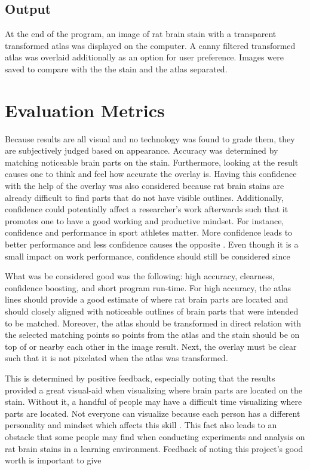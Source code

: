 \documentclass[10pt,twocolumn]{article}
\begin{document}
\subsection{Output}
At the end of the program, an image of rat brain stain with a transparent transformed atlas was displayed on the computer. A canny filtered transformed atlas was overlaid additionally as an option for user preference. Images were saved to compare with the the stain and the atlas separated. 

\section{Evaluation Metrics}
Because results are all visual and no technology was found to grade them, they are subjectively judged based on appearance. Accuracy was determined by matching noticeable brain parts on the stain. Furthermore, looking at the result causes one to think and feel how accurate the overlay is. Having this confidence with the help of the overlay was also considered because rat brain stains are already difficult to find parts that do not have visible outlines. Additionally, confidence could potentially affect a researcher's work afterwards such that it promotes one to have a good working and productive mindset. For instance, confidence and performance in sport athletes matter. More confidence leads to better performance and less confidence causes the opposite \cite{con}. Even though it is a small impact on work performance, confidence should still be considered since

What was be considered good was the following: high accuracy, clearness, confidence boosting, and short program run-time. For high accuracy, the atlas lines should provide a good estimate of where rat brain parts are located and should closely aligned with noticeable outlines of brain parts that were intended to be matched. Moreover, the atlas should be transformed in direct relation with the selected matching points so points from the atlas and the stain should be on top of or nearby each other in the image result. Next, the overlay must be clear such that it is not pixelated when the atlas was transformed.

This is determined by positive feedback, especially noting that the results provided a great visual-aid when visualizing where brain parts are located on the stain. Without it, a handful of people may have a difficult time visualizing where parts are located. Not everyone can visualize because each person has a different personality and mindset which affects this skill \cite{vis}. This fact also leads to an obstacle that some people may find when conducting experiments and analysis on rat brain stains in a learning environment. Feedback of noting this project's good worth is important to give
\end{document}
